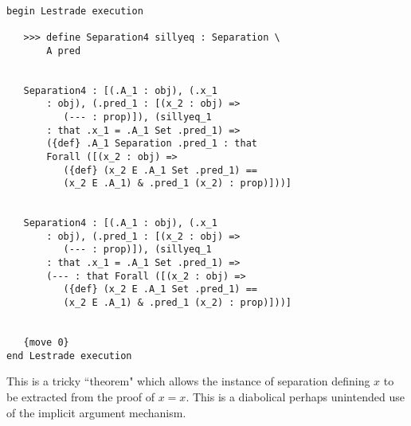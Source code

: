 \documentclass[12pt]{article}
\begin{document}
\begin{verbatim}

begin Lestrade execution

   >>> define Separation4 sillyeq : Separation \
       A pred


   Separation4 : [(.A_1 : obj), (.x_1 
       : obj), (.pred_1 : [(x_2 : obj) => 
          (--- : prop)]), (sillyeq_1 
       : that .x_1 = .A_1 Set .pred_1) => 
       ({def} .A_1 Separation .pred_1 : that 
       Forall ([(x_2 : obj) => 
          ({def} (x_2 E .A_1 Set .pred_1) == 
          (x_2 E .A_1) & .pred_1 (x_2) : prop)]))]


   Separation4 : [(.A_1 : obj), (.x_1 
       : obj), (.pred_1 : [(x_2 : obj) => 
          (--- : prop)]), (sillyeq_1 
       : that .x_1 = .A_1 Set .pred_1) => 
       (--- : that Forall ([(x_2 : obj) => 
          ({def} (x_2 E .A_1 Set .pred_1) == 
          (x_2 E .A_1) & .pred_1 (x_2) : prop)]))]


   {move 0}
end Lestrade execution
\end{verbatim}

This is a tricky ``theorem" which allows the instance of separation defining $x$ to be extracted from the proof of $x=x$.  This is a diabolical perhaps unintended use of the implicit argument mechanism.
\end{document}
